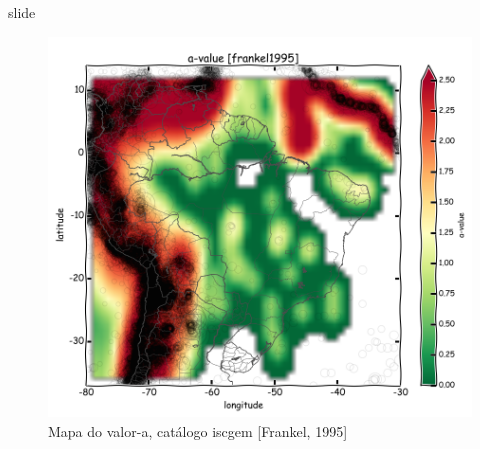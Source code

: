 \documentclass[ucs,8pt]{beamer}
\begin{document}
\begin{frame}{slide}

\begin{figure}[H]
  \centering
  \includegraphics[height=.80\textheight]{a_frankel_sa} 
  \caption{Mapa do valor-a, catálogo \gls{iscgem} [Frankel, 1995] }
  \label{fig:a_fran_sa} 
\end{figure}

\end{frame}
\end{document}

